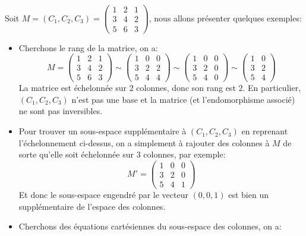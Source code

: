 \subsection*{}
Soit \(M = (C_1, C_2, C_3) = \begin{pmatrix} 1 & 2 & 1\\ 3 & 4 & 2\\ 5 & 6 & 3\end{pmatrix}\), nous allons présenter quelques exemples:
\begin{itemize}
   \item Cherchons le rang de la matrice, on a:
   \[
      M = \begin{pmatrix} 1 & 2 & 1\\ 3 & 4 & 2\\ 5 & 6 & 3\end{pmatrix} \sim  \begin{pmatrix} 1 & 0 & 0\\ 3 & 2 & 2\\ 5 & 4 & 4\end{pmatrix} \sim  \begin{pmatrix} 1 & 0 & 0\\ 3 & 2 & 0\\ 5 & 4 & 0\end{pmatrix} \sim  \begin{pmatrix} 1 & 0\\ 3 & 2\\ 5 & 4\end{pmatrix}
   \]
   La matrice est échelonnée sur \(2\) colonnes, donc son rang est \(2\). En particulier, \((C_1, C_2, C_3)\) n'est pas une base et la matrice (et l'endomorphisme associé) ne sont pas inversibles.
   \item Pour trouver un sous-espace supplémentaire à \((C_1, C_2, C_3)\) en reprenant l'échelonnement ci-dessus, on a simplement à rajouter des colonnes à \(M\) de sorte qu'elle soit échelonnée sur 3 colonnes, par exemple:
   \[
      M' = \begin{pmatrix} 1 & 0 & 0\\ 3 & 2 & 0\\ 5 & 4 & 1\end{pmatrix}
   \]
   Et donc le sous-espace engendré par le vecteur \((0, 0, 1)\) est bien un supplémentaire de l'espace des colonnes.
   \item Cherchons des équations cartésiennes du sous-espace des colonnes, on a:
   \[
\]
\end{itemize}
